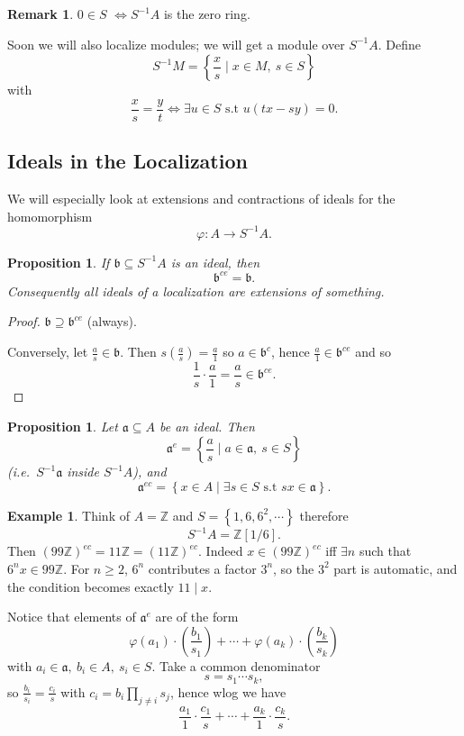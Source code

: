 \documentclass[11pt,a4paper]{article}
\theoremstyle{definition}
\newtheorem{example}[definition]{Example}
\newtheorem{remark}[definition]{Remark}
\theoremstyle{plain}
\newtheorem{proposition}[definition]{Proposition}
\theoremstyle{remark}
\newcommand{\Z}{\mathbb{Z}}
\renewcommand{\set}[1]{\left\{ #1 \right\}}
\begin{document}
\begin{remark}
    $0 \in S$ $\iff S^{-1} A$ is the zero ring.  
\end{remark}

Soon we will also localize modules; we will get a module over $S^{-1}A$.
Define
$$S^{-1} M = \set{\frac{x}{s} \mid x \in M, \ s \in S}$$
with 
$$\frac{x}{s} = \frac{y}{t} \iff \exists u \in S \text{ s.t } u(tx - sy)=0.$$

\subsection{Ideals in the Localization} 
We will especially look at extensions and contractions of ideals for the homomorphism
$$\varphi \colon A \to S^{-1} A.$$

\begin{proposition}
    If $\mathfrak{b} \subseteq S^{-1}A$ is an ideal, then 
    $$\mathfrak{b}^{ce} = \mathfrak{b}.$$
    Consequently all ideals of a localization are extensions of something. 
\end{proposition}

\begin{proof}
    $\mathfrak{b} \supseteq \mathfrak{b}^{ce}$ (always). 

    Conversely, let $\frac{a}{s} \in \mathfrak{b}$. Then $s (\frac{a}{s}) = \frac{a}{1}$ so $a \in \mathfrak{b}^c$, hence $\frac{a}{1} \in \mathfrak{b}^{ce}$ and so
    $$\frac{1}{s} \cdot \frac{a}{1} = \frac{a}{s} \in \mathfrak{b}^{ce}.$$
\end{proof}

\begin{proposition}
    Let $\mathfrak{a} \subseteq A$ be an ideal. Then 
    $$\mathfrak{a}^e = \set{\frac{a}{s} \mid a \in \mathfrak{a}, \ s \in S}$$
    (i.e.\ $S^{-1}\mathfrak a$ inside $S^{-1}A$), and
    $$\mathfrak{a}^{ec} = \set{x \in A \mid \exists s \in S \text{ s.t } sx \in \mathfrak{a}}.$$
\end{proposition}

\begin{example}
    Think of $A = \Z$ and $S = \set{1, 6, 6^2, \cdots}$ therefore 
    $$S^{-1} A = \Z[1/6].$$
    Then $(99 \Z)^{ec} = 11 \Z = (11 \Z)^{ec}$.
    Indeed $x\in(99\Z)^{ec}$ iff $\exists n$ such that $6^n x\in 99\Z$.
    For $n\ge 2$, $6^n$ contributes a factor $3^n$, so the $3^2$ part is automatic, and the condition becomes exactly $11\mid x$.
\end{example}

Notice that elements of $\mathfrak{a}^e$ are of the form 
$$\varphi(a_1) \cdot (\frac{b_1}{s_1}) + \cdots + \varphi(a_k) \cdot (\frac{b_k}{s_k})$$
with $a_i \in \mathfrak{a}, \ b_i \in A, \ s_i \in S$. Take a common denominator 
$$s = s_1 \cdots s_k,$$
so $\frac{b_i}{s_i} = \frac{c_i}{s}$ with $c_i = b_i \prod_{j\ne i} s_j$, hence wlog we have 
$$\frac{a_1}{1} \cdot \frac{c_1}{s} + \cdots + \frac{a_k}{1} \cdot \frac{c_k}{s}.$$
\end{document}
